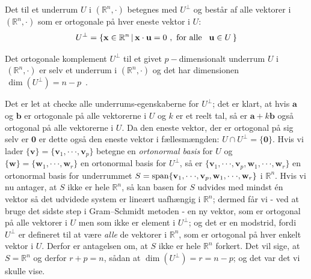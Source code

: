 \begin{definition}
Det  til et underrum $U$ i $(\mathbb{R}^{n}, \cdot)$ betegnes med $U^{\bot}$ og består af alle vektorer i $(\mathbb{R}^{n}, \cdot)$ som er ortogonale på hver eneste vektor i $U$:
\begin{equation}
U^{\bot} = \{ \mathbf{x} \in \mathbb{R}^{n} \, | \, \mathbf{x} \cdot \mathbf{u} = 0 \, \, , \, \,\textrm{for alle \, $\mathbf{u} \in U$} \, \}
\end{equation}
\end{definition}

\begin{theorem}
Det ortogonale komplement $U^{\bot}$ til et givet $p-$dimensionalt underrum $U$ i $\,(\mathbb{R}^{n}, \cdot)$ er selv et underrum i $(\mathbb{R}^{n}, \cdot)$ og det har dimensionen $\, \dim(U^{\bot}) = n-p \, $ .
\end{theorem}
\begin{bevis}
Det er let at checke alle underrums-egenskaberne for $U^{\bot}$; det er klart, at hvis $\mathbf{a}$ og $\mathbf{b}$ er ortogonale på alle vektorerne i $U$ og $k$ er et reelt tal,  så er $\mathbf{a} + k\mathbf{b}$ også ortogonal på alle vektorerne i $U$. Da den eneste vektor, der er ortogonal på sig selv er $\mathbf{0}$ er dette også den eneste vektor i fællesmængden: $U \cap U^{\bot} = \{ \mathbf{0} \}$. Hvis vi lader $\{ \mathbf{v} \} = \{ \mathbf{v}_{1}, \cdot \cdot \cdot , \mathbf{v}_{p}\} $ betegne en {\em{ortonormal basis}} for  $U$ og $\{ \mathbf{w} \} = \{ \mathbf{w}_{1}, \cdot \cdot \cdot , \mathbf{w}_{r}\} $ en ortonormal basis for $U^{\bot}$, så er  $\{  \mathbf{v}_{1}, \cdot \cdot \cdot , \mathbf{v}_{p}, \mathbf{w}_{1}, \cdot \cdot \cdot , \mathbf{w}_{r}\}$ en ortonormal basis for underrummet $S = \mathrm{span}\{\mathbf{v}_{1}, \cdot \cdot \cdot , \mathbf{v}_{p}, \mathbf{w}_{1}, \cdot \cdot \cdot , \mathbf{w}_{r}\}$ i $\mathbb{R}^{n}$. Hvis vi nu antager, at  $S$ ikke er hele $\mathbb{R}^{n}$, så kan basen for $S$ udvides med mindst \'{e}n vektor så det udvidede system er lineært uafhængig i $\mathbb{R}^{n}$; dermed får vi - ved at bruge det sidste step i Gram--Schmidt metoden - en ny vektor, som er ortogonal på alle vektorer i $U$ men som ikke er element i $U^{\bot}$; og det er en modstrid, fordi  $U^{\bot}$ er defineret til at være {\em{alle}} de vektorer i $\mathbb{R}^{n}$, som er ortogonal på hver enkelt vektor i $U$. Derfor er antagelsen om, at $S$ ikke er hele $\mathbb{R}^{n}$ forkert. Det vil sige, at $S = \mathbb{R}^{n}$ og derfor $r + p = n$, sådan at $\dim(U^{\bot}) = r = n-p$; og det var det vi skulle vise.
\end{bevis}

